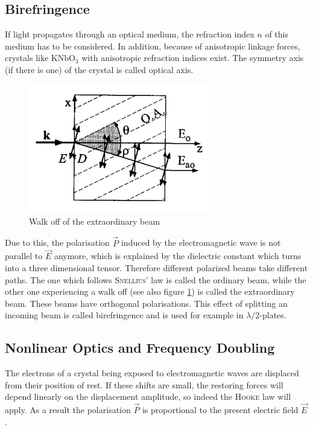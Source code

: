 \documentclass{protokoll_en}
\begin{document}
\subsection{Birefringence}
\label{cha:bi}
If light propagates through an optical medium, the refraction index $n$ of this medium has to be considered. In addition, because of anisotropic linkage forces, crystals like $\mathrm{KNbO}_3$ with anisotropic refraction indices exist. The symmetry axis (if there is one) of the crystal is called optical axis. 
\begin{figure}[H]
	\centering
		\includegraphics[width=0.7\textwidth]{graphics/brech}
	\caption{Walk off of the extraordinary beam~\cite{meschi}}
	\label{fig:brech}
\end{figure}
Due to this, the polarisation $\vec{P}$ induced by the electromagnetic wave is not parallel to $\vec{E}$ anymore, which is explained by the dielectric constant which turns into a three dimensional tensor. Therefore different polarized beams take different paths. The one which follows \textsc{Snellius'} law is called the ordinary beam, while the other one experiencing a walk off (see also figure \ref{fig:brech}) is called the extraordinary beam. These beams have orthogonal polarisations. This effect of splitting an incoming beam is called birefringence and is used for example in $\lambda/2$-plates.


\subsection{Nonlinear Optics and Frequency Doubling}
\label{cha:freqdoub}
The electrons of a crystal being exposed to electromagnetic waves are displaced from their position of rest. If these shifts are small, the restoring forces will depend linearly on the displacement amplitude, so indeed the \textsc{Hooke} law will apply. As a result the polarisation $\vec{P}$ is proportional to the present electric field $\vec{E}$. 
\end{document}

